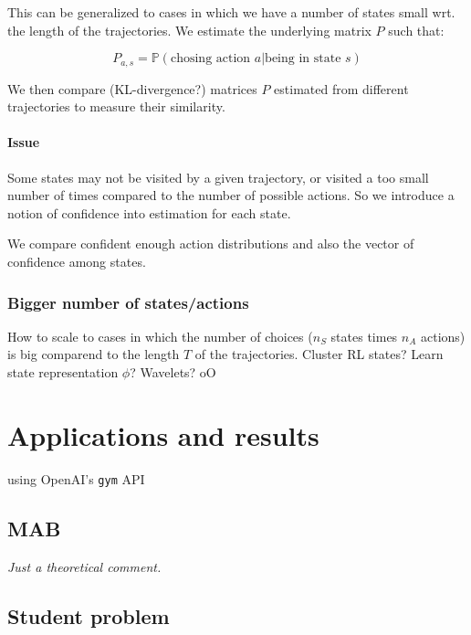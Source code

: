 \documentclass{article}
\begin{document}
This can be generalized to cases in which we have a number of states small wrt. the length of the trajectories. We estimate the underlying matrix $P$ such that:

\[
P_{a,s} = \mathbb P(\text{chosing action } a | \text{being in state } s)
\]

We then compare (KL-divergence?) matrices $P$ estimated from different trajectories to measure their similarity.

\paragraph{Issue} Some states may not be visited by a given trajectory, or visited a too small number of times compared to the number of possible actions. So we introduce a notion of confidence into estimation for each state.

We compare confident enough action distributions and also the vector of confidence among states.

\subsubsection{Bigger number of states/actions}

How to scale to cases in which the number of choices ($n_S$ states times $n_A$ actions) is big comparend to the length $T$ of the trajectories. Cluster RL states? Learn state representation $\phi$? Wavelets? oO


\section{Applications and results \label{sec:results}}

using OpenAI's \verb|gym| API

\subsection{MAB}

\emph{Just a theoretical comment.}

\subsection{Student problem}
\end{document}
